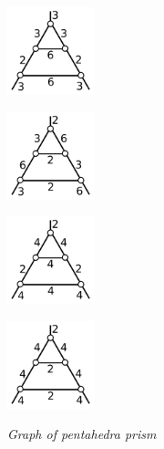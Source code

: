 \documentclass[dvipdfmx]{interact}
\theoremstyle{plain}%
\theoremstyle{definition}
\theoremstyle{remark}
\theoremstyle{problemstyle}
\begin{document}
\begin{figure}[h!tbp]
\begin{minipage}[t]{0.69\textwidth}
\begin{minipage}[t]{0.23\textwidth}
   \subcaption{}
   \label{}
  \end{minipage}
 \hspace*{\fill}
  \begin{minipage}[t]{0.23\textwidth}
   \centering
   \includegraphics[width=1in, keepaspectratio]{./img/HexahedraWithSphericalFaces/pentahedralPrism/pentahedralPrism_c.png}
   \subcaption{}
   \label{}
  \end{minipage}
 \hspace*{\fill}
  \begin{minipage}[t]{0.23\textwidth}
   \centering
   \includegraphics[width=1in, keepaspectratio]{./img/HexahedraWithSphericalFaces/pentahedralPrism/pentahedralPrism_d.png}
   \subcaption{}
   \label{}
  \end{minipage}
 \hspace*{\fill}
  \begin{minipage}[t]{0.23\textwidth}
   \centering
   \includegraphics[width=1in, keepaspectratio]{./img/HexahedraWithSphericalFaces/pentahedralPrism/pentahedralPrism_e.png}
   \subcaption{}
   \label{}
  \end{minipage}
 \hspace*{\fill}
  \begin{minipage}[t]{0.23\textwidth}
   \centering
   \includegraphics[width=1in, keepaspectratio]{./img/HexahedraWithSphericalFaces/pentahedralPrism/pentahedralPrism_f.png}
   \subcaption{}
   \label{}
  \end{minipage}
 \hspace*{\fill}
  \caption{\textit{Graph of pentahedra prism}}
  \label{fig:}
 \end{minipage}
\end{figure}
\end{document}
